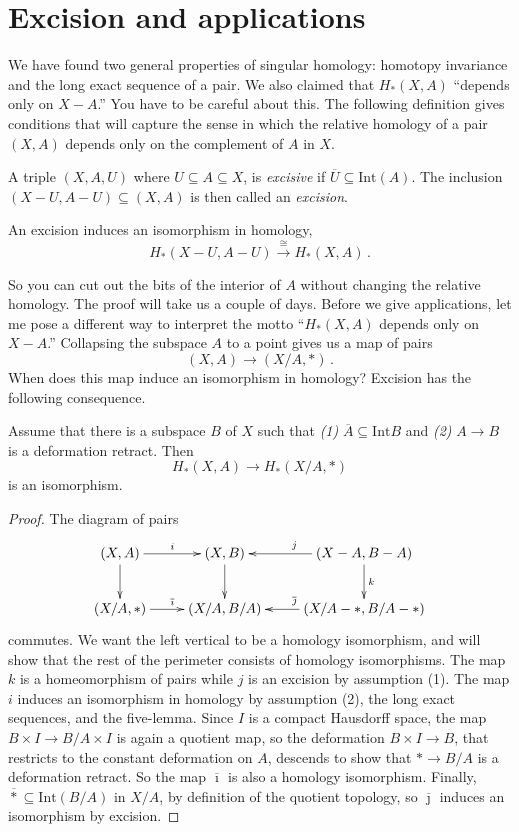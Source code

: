 \section{Excision and applications}
We have found two general properties of singular homology: homotopy invariance and the long exact sequence of a pair. We also claimed that $H_\ast(X,A)$ ``depends only on $X-A$.'' You have to be careful about this. The following definition gives conditions that will capture the sense in which the relative homology of a pair $(X,A)$ depends only on the complement of $A$ in $X$. 
\begin{definition}
A triple $(X,A,U)$ where $U\subseteq A\subseteq X$, is \emph{excisive} if $\overline{U}\subseteq\mathrm{Int}(A)$. 
The inclusion $(X-U,A-U)\subseteq (X,A)$ is then called an {\em excision}.
\end{definition}

\begin{theorem}
An excision induces an isomorphism in homology,
\[
H_\ast(X-U,A-U)\xrightarrow{\cong}H_\ast(X,A)\,.
\]
\end{theorem}
So you can cut out the bits of the interior of $A$ without changing the relative homology. The proof will take us a couple of days. Before we give applications, let me pose a different way to interpret the motto ``$H_*(X,A)$ depends only on $X-A$.'' Collapsing the subspace $A$ to a point gives us a map of pairs
\[
(X,A)\to(X/A,\ast)\,.
\]
When does this map induce an isomorphism in homology? Excision has the following consequence.
\begin{corollary} Assume that there is a subspace $B$ of $X$ such that 
{\em(1)} $\overline A\subseteq\mathrm{Int}B$ and 
{\em(2)} $A\to B$ is a deformation retract.
Then 
\[
H_*(X,A)\to H_*(X/A,*)
\]
is an isomorphism. 
\end{corollary}
\begin{proof} 
The diagram of pairs
\[
\xymatrix{
(X,A) \ar[d] \ar[r]^i & (X,B) \ar[d] & (X-A,B-A) \ar[d]^k \ar[l]_j \\
(X/A,\ast) \ar[r]^{\overline\imath} & (X/A,B/A) & 
(X/A-\ast,B/A-\ast) \ar[l]_{\overline\jmath} 
}\]
commutes. We want the left vertical to be a homology isomorphism, and
will show that the rest of the perimeter consists of homology isomorphisms.  
The map $k$ is a homeomorphism of pairs while $j$ is an excision by assumption
(1). The map $i$ induces an isomorphism in homology by assumption (2),
the long exact sequences, and the five-lemma.
Since $I$ is a compact Hausdorff space, the map $B\times I\to B/A\times I$
is again a quotient map, so the deformation $B\times I\to B$, that restricts
to the constant deformation on $A$, descends to show that $\ast\to B/A$ 
is a deformation retract. So the map $\overline\imath$ 
is also a homology isomorphism. 
Finally, $\overline\ast\subseteq\mathrm{Int}(B/A)$ in $X/A$, by definition
of the quotient topology, so $\overline\jmath$ induces an isomorphism by
excision. 
\end{proof}


